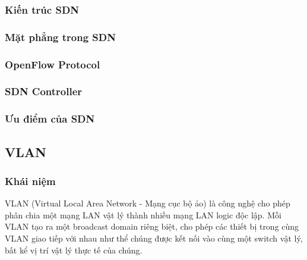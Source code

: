 \subsubsection{Kiến trúc SDN}

\subsubsection{Mặt phẳng trong SDN}

\subsubsection{OpenFlow Protocol}

\subsubsection{SDN Controller}

\subsubsection{Ưu điểm của SDN}

\subsection{VLAN}

\subsubsection{Khái niệm}
VLAN (Virtual Local Area Network - Mạng cục bộ ảo) là công nghệ cho phép phân chia một mạng LAN vật lý thành nhiều mạng LAN logic độc lập. Mỗi VLAN tạo ra một broadcast domain riêng biệt, cho phép các thiết bị trong cùng VLAN giao tiếp với nhau như thể chúng được kết nối vào cùng một switch vật lý, bất kể vị trí vật lý thực tế của chúng.

